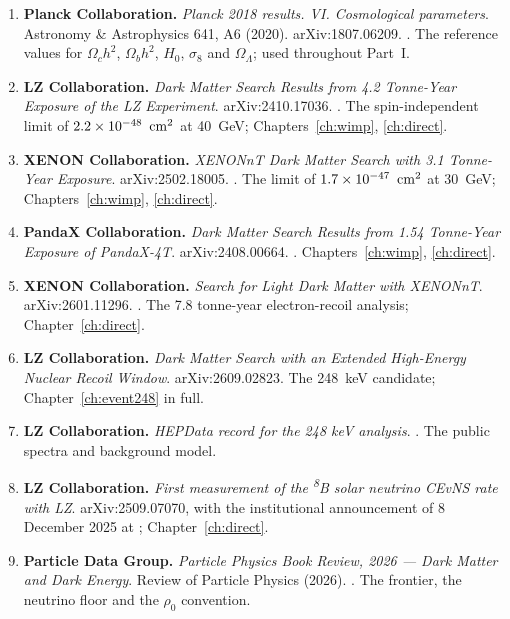\begin{enumerate}[leftmargin=1.4em,itemsep=4pt]
\item \textbf{Planck Collaboration.} \emph{Planck 2018 results. VI.
Cosmological parameters}. Astronomy \& Astrophysics 641, A6 (2020).
arXiv:1807.06209. . The reference
values for $\Omega_c h^2$, $\Omega_b h^2$, $H_0$, $\sigma_8$ and
$\Omega_\Lambda$; used throughout Part~I.
\item \textbf{LZ Collaboration.} \emph{Dark Matter Search Results from 4.2
Tonne-Year Exposure of the LZ Experiment}. arXiv:2410.17036.
. The spin-independent limit of
$2.2\times 10^{-48}\ \,\mathrm{cm}^{2}$ at 40~GeV; Chapters~\ref{ch:wimp},
\ref{ch:direct}.
\item \textbf{XENON Collaboration.} \emph{XENONnT Dark Matter Search with 3.1
Tonne-Year Exposure}. arXiv:2502.18005.
. The limit of $1.7\times 10^{-47}\ \,\mathrm{cm}^{2}$
at 30~GeV; Chapters~\ref{ch:wimp}, \ref{ch:direct}.
\item \textbf{PandaX Collaboration.} \emph{Dark Matter Search Results from
1.54 Tonne-Year Exposure of PandaX-4T}. arXiv:2408.00664.
. Chapters~\ref{ch:wimp},
\ref{ch:direct}.
\item \textbf{XENON Collaboration.} \emph{Search for Light Dark Matter with
XENONnT}. arXiv:2601.11296. . The
7.8 tonne-year electron-recoil analysis; Chapter~\ref{ch:direct}.
\item \textbf{LZ Collaboration.} \emph{Dark Matter Search with an Extended
High-Energy Nuclear Recoil Window}. arXiv:2609.02823. The 248~keV
candidate; Chapter~\ref{ch:event248} in full.
\item \textbf{LZ Collaboration.} \emph{HEPData record for the 248 keV
analysis}. . The public spectra
and background model.
\item \textbf{LZ Collaboration.} \emph{First measurement of the
\textsuperscript{8}B solar neutrino CEvNS rate with LZ}. arXiv:2509.07070,
with the institutional announcement of 8 December 2025 at
; Chapter~\ref{ch:direct}.
\item \textbf{Particle Data Group.} \emph{Particle Physics Book Review,
2026 --- Dark Matter and Dark Energy}. Review of Particle Physics (2026).
.
The frontier, the neutrino floor and the $\rho_0$ convention.

\end{enumerate}
